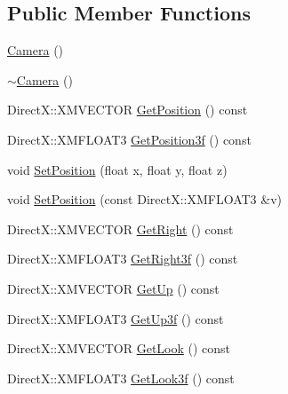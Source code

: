 \subsection*{Public Member Functions}
\begin{DoxyCompactItemize}
\item 
\hyperlink{class_camera_a01f94c3543f56ede7af49dc778f19331_a01f94c3543f56ede7af49dc778f19331}{Camera} ()
\item 
\hyperlink{class_camera_ad1897942d0ccf91052386388a497349f_ad1897942d0ccf91052386388a497349f}{$\sim$\+Camera} ()
\item 
Direct\+X\+::\+X\+M\+V\+E\+C\+T\+OR \hyperlink{class_camera_a0e4a1a4116d699cab69bc974b76ee0e9_a0e4a1a4116d699cab69bc974b76ee0e9}{Get\+Position} () const 
\item 
Direct\+X\+::\+X\+M\+F\+L\+O\+A\+T3 \hyperlink{class_camera_a245fe4f575297ca860701cbd5c708c9f_a245fe4f575297ca860701cbd5c708c9f}{Get\+Position3f} () const 
\item 
void \hyperlink{class_camera_af2a973276a03c6822cfc8dd0b763d938_af2a973276a03c6822cfc8dd0b763d938}{Set\+Position} (float x, float y, float z)
\item 
void \hyperlink{class_camera_ae4d37b50e209110d7213dd2a01a5e073_ae4d37b50e209110d7213dd2a01a5e073}{Set\+Position} (const Direct\+X\+::\+X\+M\+F\+L\+O\+A\+T3 \&v)
\item 
Direct\+X\+::\+X\+M\+V\+E\+C\+T\+OR \hyperlink{class_camera_ae6fa635fa80f12ad28f3573588be9ac1_ae6fa635fa80f12ad28f3573588be9ac1}{Get\+Right} () const 
\item 
Direct\+X\+::\+X\+M\+F\+L\+O\+A\+T3 \hyperlink{class_camera_a966ba237ec97b0904b2435b44c544415_a966ba237ec97b0904b2435b44c544415}{Get\+Right3f} () const 
\item 
Direct\+X\+::\+X\+M\+V\+E\+C\+T\+OR \hyperlink{class_camera_a36a474f59a9de2541f96cdd15f99ee0a_a36a474f59a9de2541f96cdd15f99ee0a}{Get\+Up} () const 
\item 
Direct\+X\+::\+X\+M\+F\+L\+O\+A\+T3 \hyperlink{class_camera_a7b354b4fe08362fafecfaa70d9b116af_a7b354b4fe08362fafecfaa70d9b116af}{Get\+Up3f} () const 
\item 
Direct\+X\+::\+X\+M\+V\+E\+C\+T\+OR \hyperlink{class_camera_ab2c79779e392b79d547ab6b42009cdc3_ab2c79779e392b79d547ab6b42009cdc3}{Get\+Look} () const 
\item 
Direct\+X\+::\+X\+M\+F\+L\+O\+A\+T3 \hyperlink{class_camera_a7a541aa7a41f077f027889cd882e7650_a7a541aa7a41f077f027889cd882e7650}{Get\+Look3f} () const 
\item 

\end{DoxyCompactItemize}
